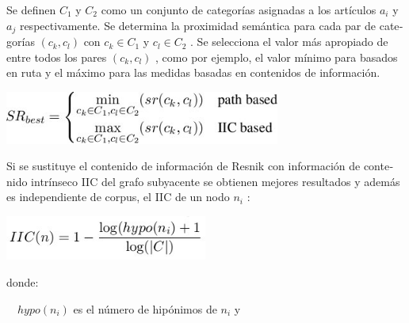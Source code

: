 \documentclass[letterpaper]{article}
\newcommand\textstylebibuscitbase[1]{#1}
\begin{document}
\bigskip

{\sffamily
\textstylebibuscitbase{\foreignlanguage{spanish}{Se definen }} $C_{1}$
\textstylebibuscitbase{\foreignlanguage{spanish}{y }} $C_{2}$
\textstylebibuscitbase{\foreignlanguage{spanish}{como un conjunto de
categor\'ias asignadas a los
}}\textstylebibuscitbase{\foreignlanguage{spanish}{art\'iculos }}
$a_{i}$ \textstylebibuscitbase{\foreignlanguage{spanish}{ y }} $a_{j}$
\textstylebibuscitbase{\foreignlanguage{spanish}{ respectivamente. Se
determina la proximidad sem\'antica para cada par de categor\'ias }}
$(c_{k},c_{l})$ \textstylebibuscitbase{\foreignlanguage{spanish}{ con
}} $c_{k}{\in}C_{1}$ \textstylebibuscitbase{\foreignlanguage{spanish}{y
}} $c_{l}{\in}C_{2}$ \textstylebibuscitbase{\foreignlanguage{spanish}{.
Se selecciona el valor m\'as apropiado de entre todos los pares }}
$(c_{k},c_{l})$ \textstylebibuscitbase{\foreignlanguage{spanish}{, como
por ejemplo, el valor m\'inimo para basados en ruta y el m\'aximo para
las medidas basadas en
}}\textstylebibuscitbase{\foreignlanguage{spanish}{contenidos de
informaci\'on.}}}



\begin{center}
\includegraphics[width=9.059cm,height=1.741cm]{Capitulo2-img9.jpg}
\end{center}
{\sffamily
\textstylebibuscitbase{\foreignlanguage{spanish}{Si se sustituye el
contenido de informaci\'on de Resnik con informaci\'on de contenido
intr\'inseco IIC del grafo subyacente se obtienen mejores resultados y
adem\'as es independiente de corpus, el IIC de un nodo }} $n_{i}$
\textstylebibuscitbase{\foreignlanguage{spanish}{:}}}



\begin{center}
\includegraphics[width=6.652cm,height=1.466cm]{Capitulo2-img10.jpg}
\end{center}
{\sffamily
donde:}

{\sffamily
\ \  $\mathit{hypo}(n_{i})$ es el n\'umero de hip\'onimos de  $n_{i}$ y}
\end{document}
